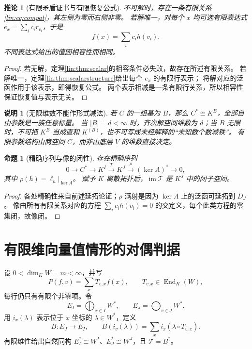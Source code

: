 \documentclass[11pt,a4paper,oneside,openany]{book}
\theoremstyle{lecture}
\newtheorem{proposition}[theorem]{命题}
\newtheorem{corollary}[theorem]{推论}
\newtheorem{remark}[theorem]{说明}
\newcommand{\End}{\operatorname{End}}
\newcommand{\im}{\operatorname{im}}
\newcommand{\T}{\mathcal T}
\numberwithin{equation}{section}
\begin{document}
\begin{corollary}[有限矛盾证书与有限恢复公式]
不可解时，存在一条有限关系\eqref{lin:eq:compat}，其左侧为零而右侧非零。
若解唯一，对每个 $x$ 均可选有限表达式 $e_x=\sum_i c_ir_{v_i}$，于是
\[
 f(x)=\sum_i c_i h(v_i).
\]
不同表达式给出的值因相容性而相同。
\end{corollary}
\begin{proof}
若无解，定理\ref{lin:thm:scalar}的相容条件必失败，故存在所述有限关系。
若解唯一，定理\ref{lin:thm:scalarstructure}给出每个 $e_x$ 的有限行表示；
将解对应的泛函作用于该表示，即得恢复公式。
两个表示相减是一条有限行关系，所以相容性保证恢复值与表示无关。
\end{proof}

\begin{remark}[无限维数不能作形式减法]
若 $C$ 的一组基为 $B$，那么 $C^*\cong K^B$，全部自由参数是一族任意标量。
当 $|B|=d<\infty$ 时，齐次解空间维数为 $d$；当 $B$ 无限时，不可把 $K^B$ 当成直和 $K^{(B)}$，也不可写成未经解释的“未知数个数减秩”。
有限参数结构由商空间 $C$，而非由底层 $V$ 的维数直接决定。
\end{remark}

\begin{proposition}[精确序列与像的闭性]
存在精确序列
\[
 0\longrightarrow C^*\longrightarrow K^I
 \xrightarrow{\T}K^J\xrightarrow{\rho}(\ker A)^*
 \longrightarrow0,
\]
其中 $\rho(h)=\ell_h|_{\ker A}$。
赋予 $K$ 离散拓扑后，$\im\T$ 是 $K^J$ 中的闭子空间。
\end{proposition}
\begin{proof}
各处精确性来自前述延拓论证；$\rho$ 满射是因为 $\ker A$ 上的泛函可延拓到 $D_J$。
像由所有有限关系对应的方程 $\sum_i c_ih(v_i)=0$ 的交定义，每个此类方程的零集闭，故像闭。
\end{proof}

\section{有限维向量值情形的对偶判据}\label{lin:sec:vectorfinite}
设 $0<\dim_KW=m<\infty$，并写
\[
 P(f,v)=\sum_x T_{v,x}f(x),\qquad T_{v,x}\in\End_K(W),
\]
每行仍只有有限个非零项。令
\[
 E_I=\bigoplus_{x\in I}W^*,\qquad E_J=\bigoplus_{v\in J}W^*.
\]
用 $i_x(\lambda)$ 表示位于 $x$ 坐标的 $\lambda\in W^*$，定义
\begin{equation}\label{lin:eq:Bdual}
 B:E_J\to E_I,\qquad
 B(i_v(\lambda))=\sum_x i_x(\lambda\circ T_{v,x}).
\end{equation}
有限维性给出自然同构 $E_I^*\cong W^I$、$E_J^*\cong W^J$，且 $\T=B^*$。
\end{document}
